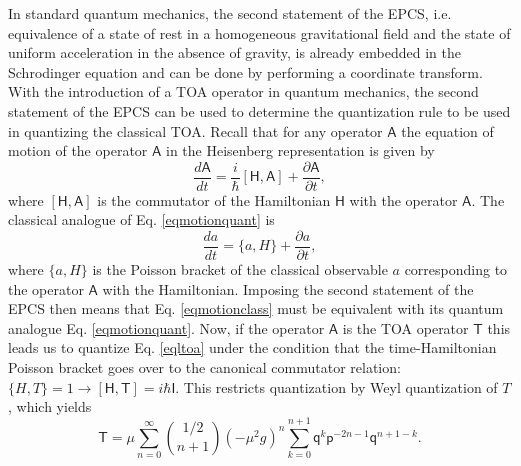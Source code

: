 \documentclass[%
 reprint,
 amsmath,amssymb,
 aps,
]{revtex4-1}
\newcommand{\opr}[1]{\ensuremath{\mathbf{\mathsf{#1}}}}
\begin{document}
In standard quantum mechanics, the second statement of the EPCS, i.e. equivalence of a state of rest in a homogeneous gravitational field and the state of uniform acceleration in the absence of gravity, is already embedded in the Schrodinger equation and can be done by performing a coordinate transform. With the introduction of a TOA operator in quantum mechanics, the second statement of the EPCS can be used to determine the quantization rule to be used in quantizing the classical TOA. Recall that for any operator $\opr{A}$ the equation of motion of the operator $\opr{A}$ in the Heisenberg representation is given by
\begin{equation}
\frac{d \opr{A}}{dt} = \frac{i}{\hbar}[\opr{H},\opr{A}]+\frac{\partial \opr{A}}{\partial t},
\label{eqmotionquant}
\end{equation}
where $[\opr{H},\opr{A}]$ is the commutator of the Hamiltonian $\opr{H}$ with the operator $\opr{A}$. The classical analogue of Eq. \eqref{eqmotionquant} is
\begin{equation}
\frac{d a}{dt} = \{a,H\}+\frac{\partial a}{\partial t},
\label{eqmotionclass}
\end{equation}
where $\{a,H\}$ is the Poisson bracket of the classical observable $a$ corresponding to the operator $\opr{A}$ with the Hamiltonian. Imposing the second statement of the EPCS then means that Eq. \eqref{eqmotionclass} must be equivalent with its quantum analogue Eq. \eqref{eqmotionquant}. Now, if the operator $\opr{A}$ is the TOA operator $\opr{T}$ this leads us to quantize Eq. \eqref{eqltoa} under the condition that the time-Hamiltonian Poisson bracket goes over to the canonical commutator relation: $\{H,T\}=1\rightarrow [\opr{H},\opr{T}]=i\hbar\opr{I}$. This restricts quantization by Weyl quantization of $T$, which yields
\begin{equation}
\opr{T}= \mu \sum_{n=0}^{\infty} \binom{1/2}{n+1} (-\mu^2 g)^{n} \sum_{k=0}^{n+1}\opr{q}^k \opr{p}^{-2n-1} \opr{q}^{n+1-k}.
\label{quantoa}
\end{equation}
\end{document}
